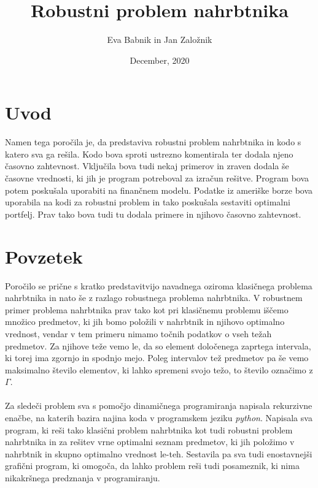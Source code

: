 \documentclass[a4paper,12pt]{article}
\theoremstyle{definition}
\begin{document}
\title{Robustni problem nahrbtnika}
\author{Eva Babnik in Jan Založnik}
\date{December, 2020}
\maketitle


\newpage
\tableofcontents
\listoffigures

\newpage
\section{Uvod}
\medskip
Namen tega poročila je, da predstaviva robustni problem nahrbtnika in kodo s katero sva ga rešila. Kodo bova sproti 
ustrezno komentirala ter dodala njeno časovno zahtevnost. Vključila bova tudi nekaj primerov in zraven dodala še časovne vrednosti, ki jih je program
potreboval za izračun rešitve. Program bova potem poskušala uporabiti na finančnem modelu. Podatke iz ameriške borze bova
uporabila na kodi za robustni problem in tako poskušala sestaviti optimalni portfelj. Prav tako bova tudi tu dodala primere in 
njihovo časovno zahtevnost.

\section{Povzetek}
\medskip
Poročilo se prične s kratko predstavitvijo navadnega oziroma klasičnega problema nahrbtnika in nato še z razlago 
robustnega problema nahrbtnika. V robustnem primer problema nahrbtnika prav tako kot pri klasičnemu problemu iščemo 
množico predmetov, ki jih bomo položili v nahrbtnik in njihovo optimalno vrednost, vendar v tem primeru nimamo točnih podatkov o 
vseh težah predmetov. Za njihove teže vemo le, da so element določenega zaprtega intervala, ki torej ima zgornjo in spodnjo mejo.
Poleg intervalov tež predmetov pa še vemo maksimalno število elementov, ki lahko spremeni svojo težo, to število označimo z $\Gamma$.
\paragraph{}
Za sledeči problem sva s pomočjo dinamičnega programiranja napisala rekurzivne enačbe, na katerih bazira
najina koda v programskem jeziku \textit{python}. Napisala sva program, ki reši tako klasični problem nahrbtnika kot 
tudi robustni problem nahrbtnika in za rešitev vrne optimalni seznam predmetov, ki jih položimo v nahrbtnik in skupno 
optimalno vrednost le-teh. Sestavila pa sva tudi enostavnejši grafični program, ki omogoča, da lahko problem reši tudi posameznik, 
ki nima nikakršnega predznanja v programiranju.
\end{document}
